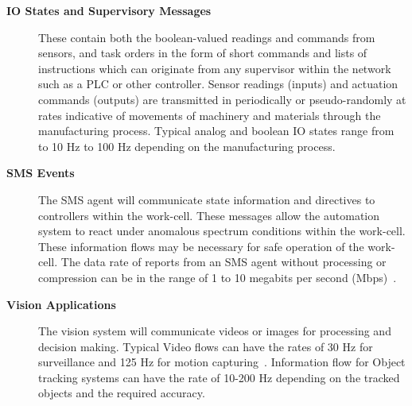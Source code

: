 \begin{description}
	\item[\textbf{IO States and Supervisory Messages}] These contain both the boolean-valued readings and commands from sensors, and task orders in the form of short commands and lists of instructions which can originate from any supervisor within the network such as a PLC or other controller. Sensor readings (inputs) and actuation commands (outputs) are transmitted in periodically or pseudo-randomly at rates indicative of movements of machinery and materials through the manufacturing process.  Typical analog and boolean IO states range from to 10 Hz to 100 Hz depending on the manufacturing process.
	
	\item[\textbf{SMS Events}] The SMS agent will communicate state information and directives to controllers within the work-cell.  These messages allow the automation system to react under anomalous spectrum conditions within the work-cell. These information flows may be necessary for safe operation of the work-cell. The data rate of reports from an SMS agent without processing or compression can be in the range of 1 to 10 megabits per second (Mbps)~\cite{Cuevas-Ruiz2015}.
	
	\item[\textbf{Vision Applications}] The vision system will communicate videos or images for processing and decision making. Typical Video flows can have the rates of 30 Hz for surveillance and 125 Hz for motion capturing~\cite{industrialCCTV}. Information flow for Object tracking systems can have the rate of 10-200 Hz depending on the tracked objects and the required accuracy. 
\end{description}



